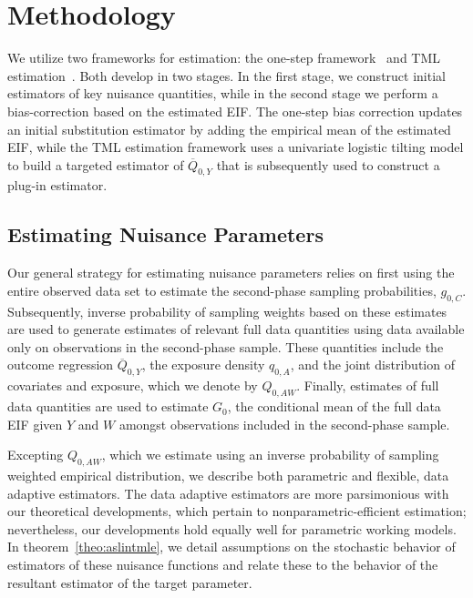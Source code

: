 \section{Methodology}\label{two_methods}

We utilize two frameworks for estimation: the one-step
framework~\citep{pfanzagl1985contributions} and TML
estimation~\citep{vdl2006targeted}. Both develop in two stages. In the first
stage, we construct initial estimators of key nuisance quantities, while in the
second stage we perform a bias-correction based on the estimated EIF. The
one-step bias correction updates an initial substitution estimator by adding the
empirical mean of the estimated EIF, while the TML estimation framework uses
a univariate logistic tilting model to build a targeted estimator of
$\overline{Q}_{0,Y}$ that is subsequently used to construct a plug-in estimator.

\subsection{Estimating Nuisance Parameters}\label{est_nuisance_param}

Our general strategy for estimating nuisance parameters relies on first using
the entire observed data set to estimate the second-phase sampling
probabilities, $g_{0,C}$. Subsequently, inverse probability of sampling weights
based on these estimates are used to generate estimates of relevant full data
quantities using data available only on observations in the second-phase sample.
These quantities include the outcome regression $\overline{Q}_{0,Y}$, the
exposure density $q_{0,A}$, and the joint distribution of covariates and
exposure, which we denote by $Q_{0,AW}$. Finally, estimates of full data
quantities are used to estimate $G_0$, the conditional mean of the full data EIF
given $Y$ and $W$ amongst observations included in the second-phase sample.

Excepting $Q_{0,AW}$, which we estimate using an inverse probability of sampling
weighted empirical distribution, we describe both parametric and flexible, data
adaptive estimators. The data adaptive estimators are more parsimonious with our
theoretical developments, which pertain to nonparametric-efficient estimation;
nevertheless, our developments hold equally well for parametric working models.
In theorem~\ref{theo:aslintmle}, we detail assumptions on the stochastic
behavior of estimators of these nuisance functions and relate these to the
behavior of the resultant estimator of the target parameter.

